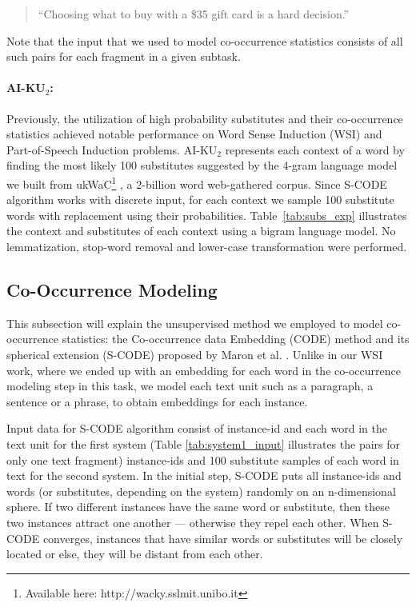 \documentclass[11pt]{article}
\begin{document}
\begin{quote}
``Choosing what to buy with a \$35 gift card is a hard decision.''
\end{quote}

Note that the input that we used to model co-occurrence statistics consists of all such pairs for each fragment in a given subtask. 

\paragraph{AI-KU$_2$:} Previously, the utilization of high probability substitutes and their co-occurrence statistics achieved notable performance on Word Sense Induction (WSI) \cite{baskaya13ai} and Part-of-Speech Induction \cite{yatbaz2012learning} problems. AI-KU$_2$ represents each context of a word by finding the most likely 100 substitutes suggested by the 4-gram language model we built from ukWaC\footnote{Available here: http://wacky.sslmit.unibo.it} \cite{ukWaC}, a 2-billion word web-gathered corpus. Since S-CODE algorithm works with discrete input, for each context we sample 100 substitute words with replacement using their probabilities. Table~\ref{tab:subs_exp} illustrates the context and substitutes of each context using a bigram language model. No lemmatization, stop-word removal and lower-case transformation were performed.

\subsection{Co-Occurrence Modeling}

This subsection will explain the unsupervised method we employed to model co-occurrence statistics: the Co-occurrence data Embedding (CODE) method \cite{globerson-CODE} and its spherical extension (S-CODE) proposed by Maron et al. . Unlike in our WSI work, where we ended up with an embedding for each
word in the co-occurrence modeling step in this task, we model each text unit such as a paragraph, a sentence or a phrase, to obtain embeddings for each instance. 

Input data for S-CODE algorithm consist of instance-id and each word in the text unit for the first system (Table \ref{tab:system1_input} illustrates the pairs for only one text fragment) instance-ids and 100 substitute samples of each word in text for the second system. In the initial step, S-CODE puts all instance-ids and words (or substitutes, depending on the system) randomly on an n-dimensional sphere. If two different instances have the same word or substitute, then these two instances attract one another --- otherwise they repel each other. When S-CODE converges, instances that have similar words or substitutes will be closely located or else, they will be distant from each other. 
\end{document}
